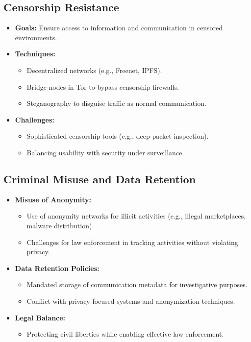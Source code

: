 \documentclass{article}
\begin{document}
\subsection{Censorship Resistance}
\begin{itemize}
    \item \textbf{Goals:} Ensure access to information and communication in censored environments.
    \item \textbf{Techniques:}
    \begin{itemize}
        \item Decentralized networks (e.g., Freenet, IPFS).
        \item Bridge nodes in Tor to bypass censorship firewalls.
        \item Steganography to disguise traffic as normal communication.
    \end{itemize}
    \item \textbf{Challenges:}
    \begin{itemize}
        \item Sophisticated censorship tools (e.g., deep packet inspection).
        \item Balancing usability with security under surveillance.
    \end{itemize}
\end{itemize}

\subsection{Criminal Misuse and Data Retention}
\begin{itemize}
    \item \textbf{Misuse of Anonymity:}
    \begin{itemize}
        \item Use of anonymity networks for illicit activities (e.g., illegal marketplaces, malware distribution).
        \item Challenges for law enforcement in tracking activities without violating privacy.
    \end{itemize}
    \item \textbf{Data Retention Policies:}
    \begin{itemize}
        \item Mandated storage of communication metadata for investigative purposes.
        \item Conflict with privacy-focused systems and anonymization techniques.
    \end{itemize}
    \item \textbf{Legal Balance:}
    \begin{itemize}
        \item Protecting civil liberties while enabling effective law enforcement.
    \end{itemize}
\end{itemize}
\end{document}
